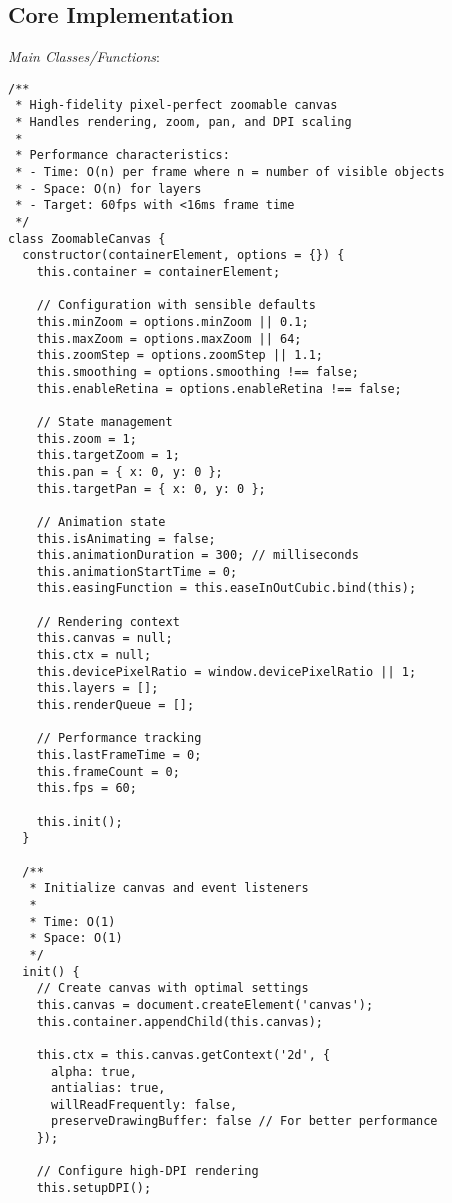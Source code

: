\documentclass[11pt]{article}
\begin{document}
\subsection{Core Implementation}
\label{sec:org05465a1}

\emph{Main Classes/Functions}:

\begin{verbatim}
/**
 * High-fidelity pixel-perfect zoomable canvas
 * Handles rendering, zoom, pan, and DPI scaling
 * 
 * Performance characteristics:
 * - Time: O(n) per frame where n = number of visible objects
 * - Space: O(n) for layers
 * - Target: 60fps with <16ms frame time
 */
class ZoomableCanvas {
  constructor(containerElement, options = {}) {
    this.container = containerElement;
    
    // Configuration with sensible defaults
    this.minZoom = options.minZoom || 0.1;
    this.maxZoom = options.maxZoom || 64;
    this.zoomStep = options.zoomStep || 1.1;
    this.smoothing = options.smoothing !== false;
    this.enableRetina = options.enableRetina !== false;
    
    // State management
    this.zoom = 1;
    this.targetZoom = 1;
    this.pan = { x: 0, y: 0 };
    this.targetPan = { x: 0, y: 0 };
    
    // Animation state
    this.isAnimating = false;
    this.animationDuration = 300; // milliseconds
    this.animationStartTime = 0;
    this.easingFunction = this.easeInOutCubic.bind(this);
    
    // Rendering context
    this.canvas = null;
    this.ctx = null;
    this.devicePixelRatio = window.devicePixelRatio || 1;
    this.layers = [];
    this.renderQueue = [];
    
    // Performance tracking
    this.lastFrameTime = 0;
    this.frameCount = 0;
    this.fps = 60;
    
    this.init();
  }
  
  /**
   * Initialize canvas and event listeners
   * 
   * Time: O(1)
   * Space: O(1)
   */
  init() {
    // Create canvas with optimal settings
    this.canvas = document.createElement('canvas');
    this.container.appendChild(this.canvas);
    
    this.ctx = this.canvas.getContext('2d', {
      alpha: true,
      antialias: true,
      willReadFrequently: false,
      preserveDrawingBuffer: false // For better performance
    });
    
    // Configure high-DPI rendering
    this.setupDPI();
    

\end{verbatim}
\end{document}
